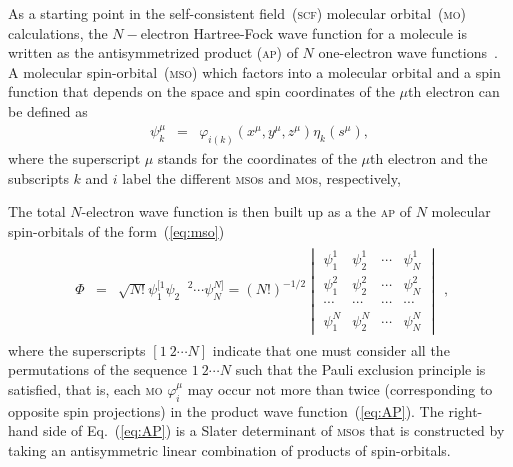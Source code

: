 As a starting point in the self-consistent field~(\textsc{scf})
molecular orbital~(\textsc{mo}) calculations, the $N-$electron
Hartree-Fock wave function for a molecule is written as the
antisymmetrized product (\textsc{ap}) of $N$ one-electron wave
functions~\cite{Roothaan_HF}. A molecular spin-orbital~(\textsc{mso})
which factors into a molecular orbital and a spin function that
depends on the space and spin coordinates of the $\mu$th electron can
be defined as
%
\begin{eqnarray}
  \psi_{k}^{\mu} & = & \varphi_{i(k)}(x^{\mu}, y^{\mu}, z^{\mu})
  \eta_{k}(s^{\mu}),
  \label{eq:mso}
\end{eqnarray}
%
where the superscript $\mu$ stands for the coordinates of the $\mu$th
electron and the subscripts $k$ and $i$ label the different
\textsc{mso}s and \textsc{mo}s, respectively,

The total $N$-electron wave function is then built up as a the
\textsc{ap} of $N$ molecular spin-orbitals of the
form~(\ref{eq:mso})~\cite{Roothaan_HF}
%
\begin{eqnarray}
  \begin{split}
    \Phi & = & \sqrt{N!}\psi_{1}^{[1} \psi_{2}^{\phantom{[]}2} \cdots \psi_{N}^{N]} =
    (N!)^{-1/2}
    \begin{vmatrix}
      \psi_{1}^{1} & \psi_{2}^{1} & \cdots & \psi_{N}^{1} \\
      \psi_{1}^{2} & \psi_{2}^{2} & \cdots & \psi_{N}^{2} \\
      \cdots & \cdots & \cdots & \cdots \\
      \psi_{1}^{N} & \psi_{2}^{N} & \cdots & \psi_{N}^{N}
    \end{vmatrix}
  \end{split},
  \label{eq:AP}
\end{eqnarray}
%
where the superscripts $[1\ 2 \cdots N]$ indicate that one must
consider all the permutations of the sequence $1\ 2 \cdots N$ such
that the Pauli exclusion principle is satisfied, that is, each
\textsc{mo} $\varphi_{i}^{\mu}$ may occur not more than twice
(corresponding to opposite spin projections) in the product wave
function~(\ref{eq:AP}). The right-hand side of Eq.~(\ref{eq:AP}) is a
Slater determinant of \textsc{mso}s that is constructed by taking an
antisymmetric linear combination of products of spin-orbitals.

